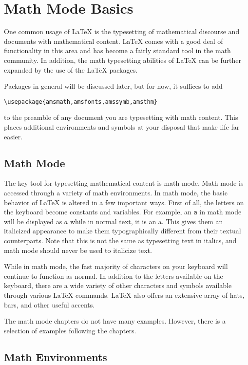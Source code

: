 \chapter{Math Mode Basics}
\label{cha:math-mode-basics}

One common usage of \LaTeX{} is the typesetting of mathematical
discourse and documents with mathematical content.  \LaTeX{} comes
with a good deal of functionality in this area and has become a fairly
standard tool in the math community.  In addition, the math
typesetting abilities of \LaTeX{} can be further expanded by the use
of the \AmS{-}\LaTeX{} packages.

Packages in general will be discussed later, but for now, it suffices
to add
\begin{verbatim}
\usepackage{amsmath,amsfonts,amssymb,amsthm}
\end{verbatim}
to the preamble of any document you are typesetting with math content.
This places additional environments and symbols at your disposal that
make life far easier.

\section{Math Mode}
\label{sec:math-mode}

The key tool for typesetting mathematical content is math mode.  Math
mode is accessed through a variety of math environments.  In math
mode, the basic behavior of \LaTeX{} is altered in a few important
ways.  First of all, the letters on the keyboard become constants and
variables.  For example, an \verb=a= in math mode will be displayed as
$a$ while in normal text, it is an a.  This gives them an italicized
appearance to make them typographically different from their textual
counterparts.  Note that this is not the same as typesetting text in
italics, and math mode should never be used to italicize text.

While in math mode, the fast majority of characters on your keyboard
will continue to function as normal.  In addition to the letters
available on the keyboard, there are a wide variety of other
characters and symbols available through various \LaTeX{} commands.
\LaTeX{} also offers an extensive array of hats, bars, and other
useful accents.

The math mode chapters do not have many examples.  However, there is a
selection of examples following the chapters.

\section{Math Environments}
\label{sec:math-environments}

